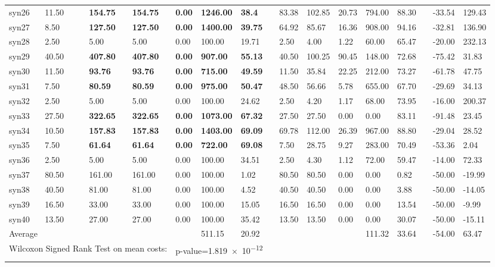 \begin{table}[H]
\begin{tabularx}{\textwidth}{XXlXXXXXlXXXXXlXX}
    syn26 & 11.50 && \textbf{154.75} & \textbf{154.75} & \textbf{0.00} & \textbf{1246.00} & \textbf{38.4} && 83.38 & 102.85 & 20.73 & 794.00 & 88.30 && -33.54 & 129.43\\
    syn27 & 8.50 && \textbf{127.50} & \textbf{127.50} & \textbf{0.00} & \textbf{1400.00} & \textbf{39.75} && 64.92 & 85.67 & 16.36 & 908.00 & 94.16 && -32.81 & 136.90\\
    syn28 & 2.50 && 5.00 & 5.00 & 0.00 & 100.00 & 19.71 && 2.50 & 4.00 & 1.22 & 60.00 & 65.47 && -20.00 & 232.13\\
    syn29 & 40.50 && \textbf{407.80} & \textbf{407.80} & \textbf{0.00} & \textbf{907.00} & \textbf{55.13} && 40.50 & 100.25 & 90.45 & 148.00 & 72.68 && -75.42 & 31.83\\
    syn30 & 11.50 && \textbf{93.76} & \textbf{93.76} & \textbf{0.00} & \textbf{715.00} & \textbf{49.59} && 11.50 & 35.84 & 22.25 & 212.00 & 73.27 && -61.78 & 47.75\\
    syn31 & 7.50 && \textbf{80.59} & \textbf{80.59} & \textbf{0.00} & \textbf{975.00} & \textbf{50.47} && 48.50 & 56.66 & 5.78 & 655.00 & 67.70 && -29.69 & 34.13\\
    syn32 & 2.50 && 5.00 & 5.00 & 0.00 & 100.00 & 24.62 && 2.50 & 4.20 & 1.17 & 68.00 & 73.95 && -16.00 & 200.37\\
    syn33 & 27.50 && \textbf{322.65} & \textbf{322.65} & \textbf{0.00} & \textbf{1073.00} & \textbf{67.32} && 27.50 & 27.50 & 0.00 & 0.00 & 83.11 && -91.48 & 23.45\\
    syn34 & 10.50 && \textbf{157.83} & \textbf{157.83} & \textbf{0.00} & \textbf{1403.00} & \textbf{69.09} && 69.78 & 112.00 & 26.39 & 967.00 & 88.80 && -29.04 & 28.52\\
    syn35 & 7.50 && \textbf{61.64} & \textbf{61.64} & \textbf{0.00} & \textbf{722.00} & \textbf{69.08} && 7.50 & 28.75 & 9.27 & 283.00 & 70.49 && -53.36 & 2.04\\
    syn36 & 2.50 && 5.00 & 5.00 & 0.00 & 100.00 & 34.51 && 2.50 & 4.30 & 1.12 & 72.00 & 59.47 && -14.00 & 72.33\\
    syn37 & 80.50 && 161.00 & 161.00 & 0.00 & 100.00 & 1.02 && 80.50 & 80.50 & 0.00 & 0.00 & 0.82 && -50.00 & -19.99\\
    syn38 & 40.50 && 81.00 & 81.00 & 0.00 & 100.00 & 4.52 && 40.50 & 40.50 & 0.00 & 0.00 & 3.88 && -50.00 & -14.05\\
    syn39 & 16.50 && 33.00 & 33.00 & 0.00 & 100.00 & 15.05 && 16.50 & 16.50 & 0.00 & 0.00 & 13.54 && -50.00 & -9.99\\
    syn40 & 13.50 && 27.00 & 27.00 & 0.00 & 100.00 & 35.42 && 13.50 & 13.50 & 0.00 & 0.00 & 30.07 && -50.00 & -15.11\\
    \hline
    \multicolumn{2}{l}{Average} &&&&& 511.15 & 20.92 &&&&& 111.32 & 33.64 && -54.00 & 63.47\\
    \hline
    \multicolumn{5}{l}{Wilcoxon Signed Rank Test on mean costs:} & \multicolumn{9}{l}{p-value=\num{1.819e-12}}\\
        \lasthline
    \end{tabularx}
    \normalsize
\end{table}
